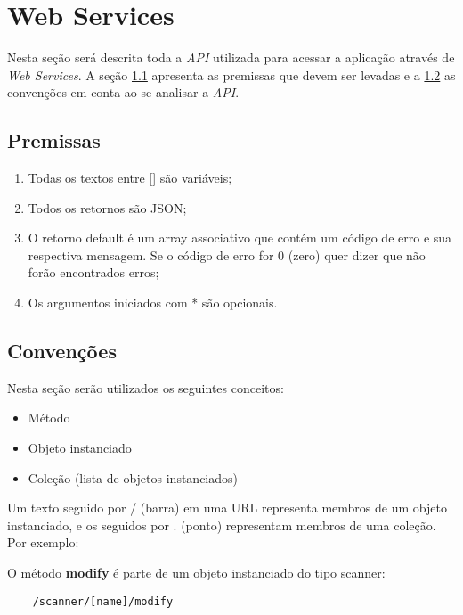 
\section{Web Services}
\label{sec:web_services}

Nesta seção será descrita toda a {\it API} utilizada para acessar a aplicação
através de {\it Web Services}. A seção \ref{sec:premissas} apresenta as 
premissas que devem ser levadas e a \ref{sec:convencoes} as convenções em conta ao se analisar a {\it API}.  

 
\subsection{Premissas}
\label{sec:premissas}

\begin{enumerate}
    \item Todas os textos entre [] são variáveis;
    \item Todos os retornos são JSON;
    \item O retorno default é um array associativo que contém um código de 
            erro e sua respectiva mensagem. Se o código de erro for 0 (zero)
            quer dizer que não forão encontrados erros;
    \item Os argumentos iniciados com * são opcionais.
\end{enumerate}
 
\subsection{Convenções}
\label{sec:convencoes}

Nesta seção serão utilizados os seguintes conceitos:

\begin{itemize}
    \item Método
    \item Objeto instanciado
    \item Coleção (lista de objetos instanciados)
\end{itemize}

Um texto seguido por / (barra) em uma URL representa membros de um objeto 
instanciado, e os seguidos por . (ponto) representam membros de uma coleção. 
Por exemplo:

O método {\bf modify} é parte de um objeto instanciado do tipo scanner:
\begin{verbatim}
    /scanner/[name]/modify
\end{verbatim}

